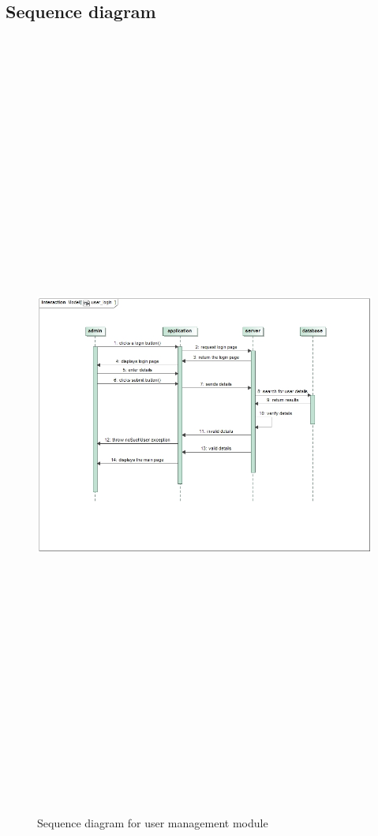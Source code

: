 \subsection{Sequence diagram}
\begin{figure}[H]
	\includegraphics[width=12cm,height=26cm,keepaspectratio]{Users/Pictures/user_sequence_diagram.png}
	\caption{Sequence diagram for user management module}\label{visina8}
\end{figure}

